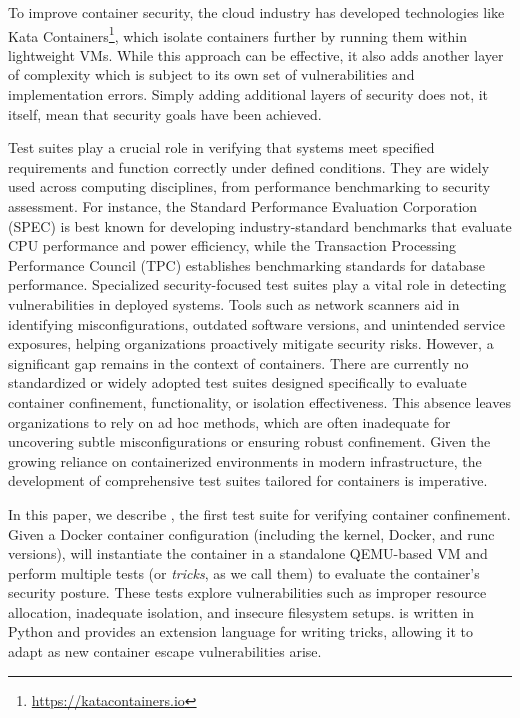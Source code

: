 To improve container security, the cloud industry has developed technologies like Kata Containers\footnote{\url{https://katacontainers.io}}, which isolate containers further by running them within lightweight VMs. While this approach can be effective, it also adds another layer of complexity which is subject to its own set of vulnerabilities and implementation errors. Simply adding additional layers of security does not, it itself, mean that security goals have been achieved.

Test suites play a crucial role in verifying that systems meet specified requirements and function correctly under defined conditions. They are widely used across computing disciplines, from performance benchmarking to security assessment. For instance, the Standard Performance Evaluation Corporation (SPEC) \cite{henning2000spec} is best known for developing industry-standard benchmarks that evaluate CPU performance and power efficiency, while the Transaction Processing Performance Council (TPC) \cite{10.1007/978-3-642-18206-8_1} establishes benchmarking standards for database performance.
Specialized security-focused test suites play a vital role in detecting vulnerabilities in deployed systems. Tools such as network scanners aid in identifying misconfigurations, outdated software versions, and unintended service exposures, helping organizations proactively mitigate security risks. However, a significant gap remains in the context of containers. There are currently no standardized or widely adopted test suites designed specifically to evaluate container confinement, functionality, or isolation effectiveness. This absence leaves organizations to rely on ad hoc methods, which are often inadequate for uncovering subtle misconfigurations or ensuring robust confinement. Given the growing reliance on containerized environments in modern infrastructure, the development of comprehensive test suites tailored for containers is imperative.

In this paper, we describe \houdini, the first test suite for verifying container confinement. Given a Docker container configuration (including the kernel, Docker, and runc versions), \houdini will instantiate the container in a standalone QEMU-based VM and perform multiple tests (or \textit{tricks}, as we call them) to evaluate the container's security posture. These tests explore vulnerabilities such as improper resource allocation, inadequate isolation, and insecure filesystem setups. \houdini is written in Python and provides an extension language for writing tricks, allowing it to adapt as new container escape vulnerabilities arise.

